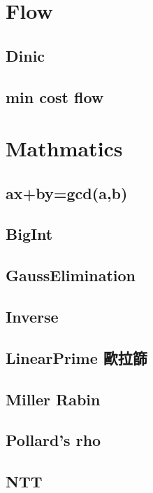 \section{Flow}

\subsection{Dinic}

\subsection{min cost flow}


\section{Mathmatics}

\subsection{ax+by=gcd(a,b)}

\subsection{BigInt}

\subsection{GaussElimination}

\subsection{Inverse}

\subsection{LinearPrime 歐拉篩}

\subsection{Miller Rabin}

\subsection{Pollard's rho}

\subsection{NTT}


